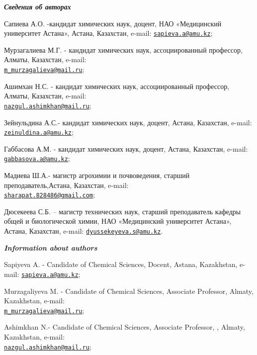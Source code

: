 \begin{authorinfo}
\hspace{1em}\emph{{\bfseries Сведения об авторах}}

Сапиева А.О. -кандидат химических наук, доцент, НАО «Медицинский
университет Астана», Астана, Казахстан, e-mail:
\href{mailto:sapieva.a@amu.kz}{\nolinkurl{sapieva.a@amu.kz}};

Мурзагалиева М.Г. - кандидат химических наук, ассоциированный профессор,
Алматы, Казахстан, e-mail:
\\\href{mailto:m_murzagalieva@mail.ru}{\nolinkurl{m\_murzagalieva@mail.ru}};

Ашимхан Н.С. - кандидат химических наук, ассоциированный профессор,
Алматы, Казахстан, e-mail:
\\\href{mailto:nazgul.ashimkhan@mail.ru}{\nolinkurl{nazgul.ashimkhan@mail.ru}};

Зейнульдина А.С.- кандидат химических наук, доцент, Астана, Казахстан,
e-mail:
\href{mailto:zeinuldina.a@amu.kz}{\nolinkurl{zeinuldina.a@amu.kz}};

Габбасова А.М. - кандидат химических наук, доцент, Астана, Казахстан,
e-mail:
\href{mailto:gabbasova.a@amu.kz}{\nolinkurl{gabbasova.a@amu.kz}};

Мадиева Ш.А.- магистр агрохимии и почвоведения, старший
преподаватель,Астана, Казахстан, e-mail:\\
\href{mailto:sharapat.828486@gmail.com}{\nolinkurl{sharapat.828486@gmail.com}};

Дюсекеева С.Б. -- магистр технических наук, старший преподаватель
кафедры общей и биологической химии, НАО «Медицинский университет
Астана», Астана, Казахстан, e-mail:
\href{mailto:dyussekeyeva.s@amu.kz}{\nolinkurl{dyussekeyeva.s@amu.kz}}.

\hspace{1em}\emph{{\bfseries Information about authors}}

Sapiyeva A. - Candidate of Chemical Sciences, Docent, Astana,
Kazakhstan, e-mail:
\href{mailto:sapieva.a@amu.kz}{\nolinkurl{sapieva.a@amu.kz}};

Murzagaliyeva M. - Candidate of Chemical Sciences, Associate Professor,
Almaty, Kazakhstan, e-mail:
\\\href{mailto:m_murzagalieva@mail.ru}{\nolinkurl{m\_murzagalieva@mail.ru}};

Ashimkhan N.- Candidate of Chemical Sciences, Associate Professor, ,
Almaty, Kazakhstan, e-mail:
\\\href{mailto:nazgul.ashimkhan@mail.ru}{\nolinkurl{nazgul.ashimkhan@mail.ru}};


\end{authorinfo}
